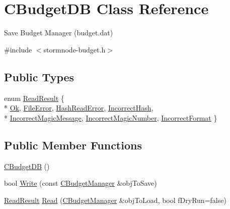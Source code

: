 \hypertarget{class_c_budget_d_b}{}\section{C\+Budget\+D\+B Class Reference}
\label{class_c_budget_d_b}


Save Budget Manager (budget.\+dat)  




{\ttfamily \#include $<$stormnode-\/budget.\+h$>$}

\subsection*{Public Types}
\begin{DoxyCompactItemize}
\item 
enum \hyperlink{class_c_budget_d_b_a53586703b6648c7cabbf9cdcfef5f7d9}{Read\+Result} \{ \\*
\hyperlink{class_c_budget_d_b_a53586703b6648c7cabbf9cdcfef5f7d9abb62dc76c646498e10e16e9b6c9d8b0b}{Ok}, 
\hyperlink{class_c_budget_d_b_a53586703b6648c7cabbf9cdcfef5f7d9a63cc82db74636abbd3f287b95964cfdf}{File\+Error}, 
\hyperlink{class_c_budget_d_b_a53586703b6648c7cabbf9cdcfef5f7d9a7a5d90d6315bc578e40d2c818ce36f6f}{Hash\+Read\+Error}, 
\hyperlink{class_c_budget_d_b_a53586703b6648c7cabbf9cdcfef5f7d9acd45e30fb7f265eb10eb5695384a56de}{Incorrect\+Hash}, 
\\*
\hyperlink{class_c_budget_d_b_a53586703b6648c7cabbf9cdcfef5f7d9a6201c744a8b2fad298cf9e3c45313a81}{Incorrect\+Magic\+Message}, 
\hyperlink{class_c_budget_d_b_a53586703b6648c7cabbf9cdcfef5f7d9a43c8f9f7bf5af64dea37be81dae953ff}{Incorrect\+Magic\+Number}, 
\hyperlink{class_c_budget_d_b_a53586703b6648c7cabbf9cdcfef5f7d9a38c7fec029b0c59cfa63cfb616bafe39}{Incorrect\+Format}
 \}
\end{DoxyCompactItemize}
\subsection*{Public Member Functions}
\begin{DoxyCompactItemize}
\item 
\hyperlink{class_c_budget_d_b_a133c5d41d7aa4a73b02a14bd286b4503}{C\+Budget\+D\+B} ()
\item 
bool \hyperlink{class_c_budget_d_b_a7c9bd15eefe04f87e822cc1bc0887b76}{Write} (const \hyperlink{class_c_budget_manager}{C\+Budget\+Manager} \&obj\+To\+Save)
\item 
\hyperlink{class_c_budget_d_b_a53586703b6648c7cabbf9cdcfef5f7d9}{Read\+Result} \hyperlink{class_c_budget_d_b_aecdde2af475070d9fafdcacf93f2e4f2}{Read} (\hyperlink{class_c_budget_manager}{C\+Budget\+Manager} \&obj\+To\+Load, bool f\+Dry\+Run=false)
\end{DoxyCompactItemize}


